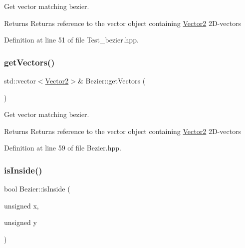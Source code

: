 Get vector matching bezier. 

\begin{DoxyReturn}{Returns}
Returns reference to the vector object containing \mbox{\hyperlink{classVector2}{Vector2}} 2\+D-\/vectors 
\end{DoxyReturn}


Definition at line 51 of file Test\+\_\+bezier.\+hpp.

\mbox{\label{classBezier_a26bf332b0c831e0f302f1d72ec782436}} 
\subsubsection{\texorpdfstring{get\+Vectors()}{getVectors()}\hspace{0.1cm}{\footnotesize\ttfamily [2/2]}}
{\footnotesize\ttfamily std\+::vector$<$\mbox{\hyperlink{classVector2}{Vector2}}$>$\& Bezier\+::get\+Vectors (\begin{DoxyParamCaption}{ }\end{DoxyParamCaption})\hspace{0.3cm}{\ttfamily [inline]}}



Get vector matching bezier. 

\begin{DoxyReturn}{Returns}
Returns reference to the vector object containing \mbox{\hyperlink{classVector2}{Vector2}} 2\+D-\/vectors 
\end{DoxyReturn}


Definition at line 59 of file Bezier.\+hpp.

\mbox{\label{classBezier_a1ea801d6578a5858939b87775a9ea654}} 
\subsubsection{\texorpdfstring{is\+Inside()}{isInside()}}
{\footnotesize\ttfamily bool Bezier\+::is\+Inside (\begin{DoxyParamCaption}\item[{unsigned}]{x,  }\item[{unsigned}]{y }\end{DoxyParamCaption})}



